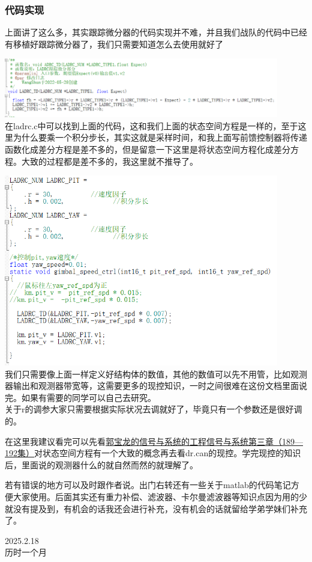 \documentclass[UTF8,a4paper,12pt]{ctexart}
\begin{document}
          \subsubsection{代码实现}
          上面讲了这么多，其实跟踪微分器的代码实现并不难，并且我们战队的代码中已经有移植好跟踪微分器了，我们只需要知道怎么去使用就好了
            \par \includegraphics[width=12cm]{picture/tracking_differentiator_code.png}
              \\在ladrc.c中可以找到上面的代码，这和我们上面的状态空间方程是一样的，至于这里为什么要乘一个积分步长，其实这就是采样时间，和我上面写前馈控制器将传递函数化成差分方程是差不多的，但是留意一下这里是将状态空间方程化成差分方程。大致的过程都是差不多的，我这里就不推导了。
            \par \includegraphics[width=12cm]{picture/tracking_differentiator_code_expng.png}\\
              我们只需要像上面一样定义好结构体的数值，其他的数值可以先不用管，比如观测器输出和观测器带宽等，这需要更多的现控知识，一时之间很难在这份文档里面说完。如果有需要的同学可以自己去研究。\\
              关于r的调参大家只需要根据实际状况去调就好了，毕竟只有一个参数还是很好调的。
              \begin{flushleft}
                在这里我建议看完可以先看\href{https://www.bilibili.com/video/BV1PZ4y1t7DA?spm_id_from=333.788.videopod.episodes&vd_source=b02f21f21dd17ebeef8dac9338c9d06c&p=192}{郭宝龙的信号与系统的工程信号与系统第三章（189—192集）}对状态空间方程有一个大致的概念再去看dr.can的现控。学完现控的知识后，里面说的观测器什么的就自然而然的就理解了。
              \end{flushleft}
              



            \begin{flushleft}
              若有错误的地方可以及时跟作者说。出门右转还有一些关于matlab的代码笔记方便大家使用。后面其实还有重力补偿、滤波器、卡尔曼滤波器等知识点因为用的少就没有提及到，有机会的话我还会进行补充，没有机会的话就留给学弟学妹们补充了。
            \end{flushleft}
        \begin{flushright}
          2025.2.18\\
          历时一个月
        \end{flushright}
\end{document}
